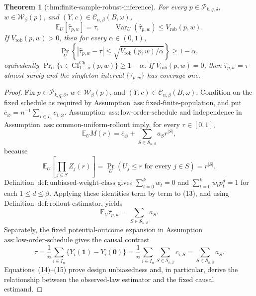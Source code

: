 \documentclass{article}
\newtheorem{theorem}{Theorem}
\begin{document}
\begin{theorem}[thm:finite-sample-robust-inference]\label{thm:finite-sample-robust-inference}
For every \(p\in\mathcal P_{k,q,\delta}\), \(w\in\mathcal W_\beta(p)\), and \((Y,c)\in\mathcal C_{n,\beta}(B,\omega)\), \[\mathbb E_U[\widehat\tau_{p,w}]=\tau,\qquad \operatorname{Var}_U(\widehat\tau_{p,w})\le V_{\mathrm{rob}}(p,w).\] If \(V_{\mathrm{rob}}(p,w)>0\), then for every \(\alpha\in(0,1)\), \[\Pr_U\!\left\{|\widehat\tau_{p,w}-\tau|\le\sqrt{V_{\mathrm{rob}}(p,w)/\alpha}\right\}\ge1-\alpha,\] equivalently \(\Pr_U\{\tau\in\mathrm{CI}^{\mathrm{Ch}}_{1-\alpha}(p,w)\}\ge1-\alpha\). If \(V_{\mathrm{rob}}(p,w)=0\), then \(\widehat\tau_{p,w}=\tau\) almost surely and the singleton interval \(\{\widehat\tau_{p,w}\}\) has coverage one.
\end{theorem}
\begin{proof}
Fix \(p\in\mathcal P_{k,q,\delta}\), \(w\in\mathcal W_\beta(p)\), and \((Y,c)\in\mathcal C_{n,\beta}(B,\omega)\).  Condition on the fixed schedule as required by Assumption~\(\mathrm{ass{:}fixed\text{-}finite\text{-}population}\), and put \(\bar c_{\varnothing}=n^{-1}\sum_{i\in I_n}c_{i,\varnothing}\).  Assumption~\(\mathrm{ass{:}low\text{-}order\text{-}schedule}\) and independence in Assumption~\(\mathrm{ass{:}common\text{-}uniform\text{-}rollout}\) imply, for every \(r\in[0,1]\),
\[
\mathbb E_U M(r)
=\bar c_{\varnothing}
+\sum_{S\in\mathcal S_{n,\beta}}a_Sr^{|S|},
\tag{13}
\]
because
\[
\mathbb E_U\!\left[\prod_{j\in S}Z_j(r)\right]
=\Pr_U(U_j\le r\text{ for every }j\in S)=r^{|S|}.
\]
Definition~\(\mathrm{def{:}unbiased\text{-}weight\text{-}class}\) gives \(\sum_{t=0}^kw_t=0\) and \(\sum_{t=0}^kw_tp_t^d=1\) for each \(1\le d\le\beta\).  Applying these identities term by term to (13), and using Definition~\(\mathrm{def{:}rollout\text{-}estimator}\), yields
\[
\mathbb E_U\widehat\tau_{p,w}
=\sum_{S\in\mathcal S_{n,\beta}}a_S.
\tag{14}
\]
Separately, the fixed potential-outcome expansion in Assumption~\(\mathrm{ass{:}low\text{-}order\text{-}schedule}\) gives the causal contrast
\[
\tau
=\frac1n\sum_{i\in I_n}\{Y_i(\mathbf1)-Y_i(\mathbf0)\}
=\frac1n\sum_{i\in I_n}\sum_{S\in\mathcal S_{n,\beta}}c_{i,S}
=\sum_{S\in\mathcal S_{n,\beta}}a_S.
\tag{15}
\]
Equations~(14)--(15) prove design unbiasedness and, in particular, derive the relationship between the observed-law estimator and the fixed causal estimand.


\end{proof}
\end{document}
